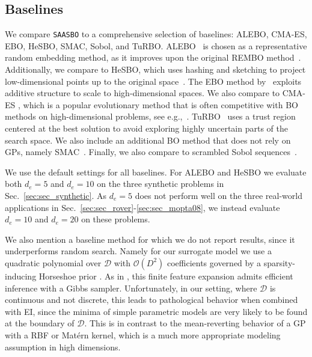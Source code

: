 \documentclass[accepted]{uai2021} %
\newcommand{\algoname}{{\texttt {SAASBO}}}
\newcommand{\DD}{\mathcal{D}}
\newcommand{\OO}{\mathcal{O}}
\begin{document}
\subsection{Baselines}
We compare \algoname{} to a comprehensive selection of baselines: ALEBO, CMA-ES, EBO, HeSBO, SMAC, Sobol, and TuRBO.
ALEBO~\citep{letham2020re} is chosen as a representative random embedding method, as it improves upon the original REMBO method~\citep{wang2016bayesian}.
Additionally, we compare to HeSBO, which uses hashing and sketching to project low-dimensional points up to the original space~\citep{nayebi2019framework}.
The EBO method by~\citet{wang2018batched} exploits additive structure to scale to high-dimensional spaces.
We also compare to CMA-ES \citep{hansen2003reducing}, which is a popular evolutionary method that is often competitive with BO methods on high-dimensional problems, see e.g.,~\citep{letham2020re}.
TuRBO~\citep{turbo} uses a trust region centered at the best solution to avoid exploring highly uncertain parts of the search space.
We also include an additional BO method that does not rely on GPs, namely SMAC~\citep{hutter2011sequential}.
Finally, we also compare to scrambled Sobol sequences~\citep{owen2003quasi}.

We use the default settings for all baselines.
For ALEBO and HeSBO we evaluate both $d_e=5$ and $d_e=10$ on the three synthetic problems in Sec.~\ref{sec:sec_synthetic}.
As $d_e=5$ does not perform well on the three real-world applications in Sec.~\ref{sec:sec_rover}-\ref{sec:sec_mopta08}, we instead evaluate $d_e=10$ and $d_e=20$ on these problems.

We also mention a baseline method for which we do not report results, since it underperforms random search.
Namely for our surrogate model we use a quadratic polynomial over $\DD$ with $\OO(D^2)$ coefficients governed by a
sparsity-inducing Horseshoe prior \citep{carvalho2009handling}.
As in \cite{baptista2018bayesian}, this finite feature expansion admits efficient inference with a Gibbs sampler.
Unfortunately, in our setting, where $\DD$ is continuous and not discrete, this leads to pathological behavior
when combined with EI, since the minima of simple parametric models are very likely to be found at the boundary of $\DD$.
This is in contrast to the mean-reverting behavior of a GP with a RBF or Mat\'ern kernel, which is a much more appropriate modeling assumption in high dimensions.
\end{document}
